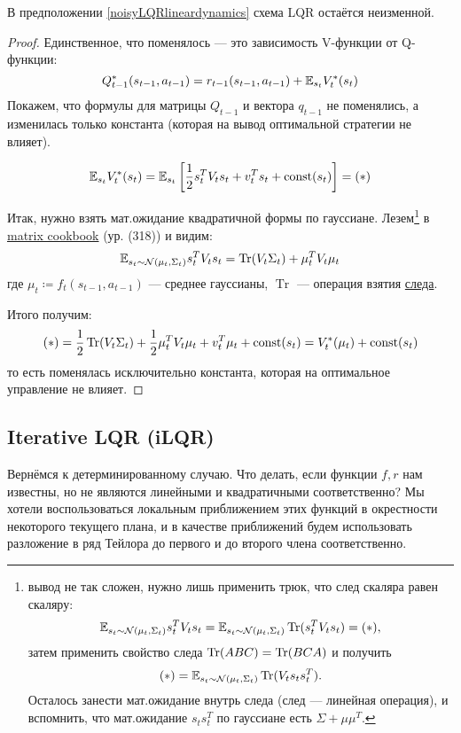 \begin{theorem}
В предположении \eqref{noisyLQRlineardynamics} схема LQR остаётся неизменной.
\begin{proof}
Единственное, что поменялось --- это зависимость V-функции от Q-функции:
$$Q^*_{t-1}(s_{t-1}, a_{t-1}) = r_{t-1}(s_{t-1}, a_{t-1}) + \mathbb{E}_{s_t} V_t^*(s_t)$$
Покажем, что формулы для матрицы $Q_{t-1}$ и вектора $q_{t-1}$ не поменялись, а изменилась только константа (которая на вывод оптимальной стратегии не влияет).

$$\mathbb{E}_{s_t} V^*_t(s_t) = \mathbb{E}_{s_t} \left[ \frac{1}{2} s_t^TV_ts_t + v_t^T s_t + \operatorname{const}(s_t) \right] = (*)$$

Итак, нужно взять мат.ожидание квадратичной формы по гауссиане. Лезем\footnote{вывод не так сложен, нужно лишь применить трюк, что след скаляра равен скаляру: $$\mathbb{E}_{s_t \sim \mathcal{N}(\mu_t, \Sigma_t)} s_t^TV_ts_t = \mathbb{E}_{s_t \sim \mathcal{N}(\mu_t, \Sigma_t)} \operatorname{Tr}(s_t^TV_ts_t) = (*),$$ затем применить свойство следа $\operatorname{Tr}(ABC) = \operatorname{Tr}(BCA)$ и получить $$(*) = \mathbb{E}_{s_t \sim \mathcal{N}(\mu_t, \Sigma_t)} \operatorname{Tr}(V_ts_ts_t^T).$$ Осталось занести мат.ожидание внутрь следа (след --- линейная операция), и вспомнить, что мат.ожидание $s_t s_t^T$ по гауссиане есть $\Sigma + \mu \mu^T$.} в \href{https://www.math.uwaterloo.ca/~hwolkowi/matrixcookbook.pdf}{matrix cookbook} (ур. (318)) и видим:
$$\mathbb{E}_{s_t \sim \mathcal{N}(\mu_t, \Sigma_t)} s_t^TV_ts_t = \operatorname{Tr}(V_t \Sigma_t) + \mu_t^TV_t\mu_t$$
где $\mu_t \coloneqq f_t(s_{t-1}, a_{t-1})$ --- среднее гауссианы, $\operatorname{Tr}$ --- операция взятия \href{https://ru.wikipedia.org/wiki/\%D0\%A1\%D0\%BB\%D0\%B5\%D0\%B4_\%D0\%BC\%D0\%B0\%D1\%82\%D1\%80\%D0\%B8\%D1\%86\%D1\%8B}{следа}.

Итого получим:
$$(*) = \frac{1}{2} \operatorname{Tr}(V_t \Sigma_t) + \frac{1}{2} \mu_t^TV_t\mu_t + v_t^T \mu_t + \operatorname{const}(s_t) = V^*_t(\mu_t) + \operatorname{const}(s_t)$$
то есть поменялась исключительно константа, которая на оптимальное управление не влияет.
\end{proof}
\end{theorem}

\subsection{Iterative LQR (iLQR)}

Вернёмся к детерминированному случаю. Что делать, если функции $f, r$ нам известны, но не являются линейными и квадратичными соответственно? Мы хотели воспользоваться локальным приближением этих функций в окрестности некоторого текущего плана, и в качестве приближений будем использовать разложение в ряд Тейлора до первого и до второго члена соответственно.

